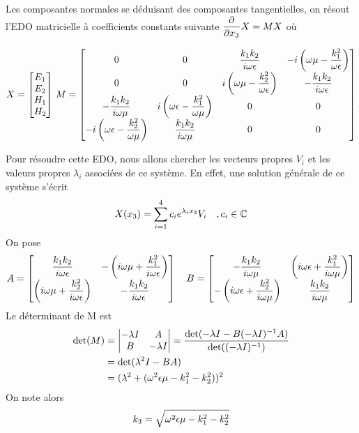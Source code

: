 Les composantes normales se déduisant des composantes tangentielles, on résout l'EDO matricielle à coefficients constants 
suivante $\dfrac{\partial^{{}} }{{\partial x_3}^{{}}}X = M X$ où

\begin{equation}
    X = 
    \begin{bmatrix}
    E_1 \\ 
    E_2 \\ 
    H_1 \\ 
    H_2 \\
    \end{bmatrix}\,
    M = \begin{bmatrix}
    0 & 0 & \dfrac{k_1k_2}{i\omega\epsilon} & -i\left(\omega\mu - \dfrac{k_1^2}{\omega\epsilon}\right)\\
    0 & 0 & i\left(\omega\mu - \dfrac{k_2^2}{\omega\epsilon}\right) & -\dfrac{k_1k_2}{i\omega\epsilon}\\
    -\dfrac{k_1k_2}{i\omega\mu} & i\left(\omega\epsilon - \dfrac{k_1^2}{\omega\mu}\right) & 0 & 0 \\
    -i\left(\omega\epsilon - \dfrac{k_2^2}{\omega\mu}\right) & \dfrac{k_1k_2}{i\omega\mu} & 0 & 0 \\
    \end{bmatrix}
\end{equation}

Pour résoudre cette EDO, nous allons chercher les vecteurs propres $V_i$ et les valeurs propres $\lambda_i$ associées de ce système. En effet, une solution générale de ce système s'écrit
\begin{equation}
    X(x_3)= \sum\limits_{i=1}^{4}c_i e^{\lambda_i x_3} V_i \quad , c_i \in \mathbb C
\end{equation}
On pose 
\begin{equation}
    A = \begin{bmatrix}
        \dfrac{k_1k_2}{i\omega\epsilon} & -\left(i\omega\mu + \dfrac{k_1^2}{i\omega\epsilon}\right) \\
        \left(i\omega\mu + \dfrac{k_2^2}{i\omega\epsilon}\right) & -\dfrac{k_1k_2}{i\omega\epsilon} \\
    \end{bmatrix}
    \quad
    B = \begin{bmatrix}
        -\dfrac{k_1k_2}{i\omega\mu} & \left(i\omega\epsilon + \dfrac{k_1^2}{i\omega\mu}\right) \\
        -\left(i\omega\epsilon + \dfrac{k_2^2}{i\omega\mu}\right) & \dfrac{k_1k_2}{i\omega\mu} \\
    \end{bmatrix}
\end{equation}
Le déterminant de M est
\begin{align*}
    \det(M) &= 
    \begin{vmatrix}
        -\lambda I & A \\
        B & -\lambda I
    \end{vmatrix}
        = \dfrac{\det(- \lambda I - B(-\lambda I)^{-1} A)}{\det((-\lambda I)^{-1})} \\
        &= \det(\lambda^2 I - BA) \\
        &= (\lambda^2 + (\omega^2\epsilon\mu - k_1^2 -k_2^2))^2
\end{align*}
On note alors 
\begin{equation}
k_3=\sqrt{\omega^2\epsilon\mu - k_1^2 -k_2^2}
\end{equation}

